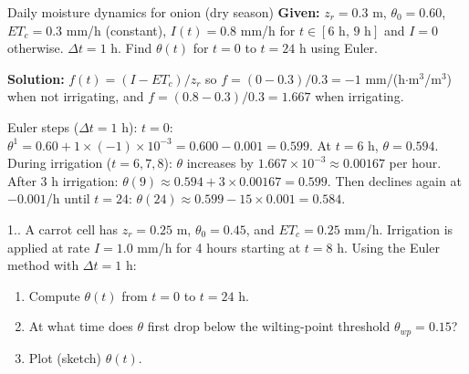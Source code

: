 \documentclass[12pt,a4paper,openany]{book}
\newcounter{exoctr}[chapter]
\renewcommand{\theexoctr}{\thechapter.\arabic{exoctr}}
\begin{document}
\begin{exbox}{Daily moisture dynamics for onion (dry season)}
\textbf{Given:} $z_r=0.3$ m, $\theta_0=0.60$, $ET_c = 0.3$ mm/h (constant),
$I(t)=0.8$ mm/h for $t\in[6\text{ h},\,9\text{ h}]$ and $I=0$ otherwise.
$\Delta t = 1$ h. Find $\theta(t)$ for $t=0$ to $t=24$ h using Euler.

\textbf{Solution:} $f(t) = (I-ET_c)/z_r$ so $f = (0-0.3)/0.3 = -1$ mm/(h$\cdot$m$^3$/m$^3$)
when not irrigating, and $f=(0.8-0.3)/0.3=1.667$ when irrigating.

Euler steps ($\Delta t=1$ h):
$t=0$: $\theta^1 = 0.60 + 1\times(-1)\times10^{-3} = 0.600 - 0.001 = 0.599$. At $t=6$ h, $\theta=0.594$.
During irrigation ($t=6,7,8$): $\theta$ increases by $1.667\times10^{-3}\approx 0.00167$ per hour.
After 3 h irrigation: $\theta(9)\approx 0.594+3\times0.00167=0.599$.
Then declines again at $-0.001$/h until $t=24$: $\theta(24)\approx 0.599-15\times0.001=0.584$.
\end{exbox}

\begin{exobox}{1.\theexoctr}
A carrot cell has $z_r=0.25$ m, $\theta_0=0.45$, and $ET_c=0.25$ mm/h.
Irrigation is applied at rate $I=1.0$ mm/h for 4 hours starting at $t=8$ h.
Using the Euler method with $\Delta t=1$ h:
\begin{enumerate}[label=(\alph*)]
  \item Compute $\theta(t)$ from $t=0$ to $t=24$ h.
  \item At what time does $\theta$ first drop below the wilting-point threshold $\theta_{wp}=0.15$?
  \item Plot (sketch) $\theta(t)$.
\end{enumerate}
\end{exobox}
\end{document}
